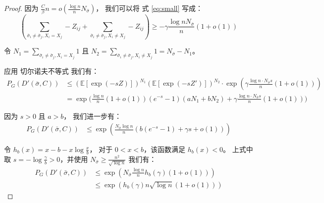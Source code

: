 \begin{proof}
	因为 $\frac{C}{\beta} n = o\left(\frac{\log n}{n} N_{\bar{\sigma}} \right)$，
  我们可以将 式 \eqref{eq:small} 写成：
\begin{equation}
	\left( \sum_{\bar{\sigma}_i  \neq \bar{\sigma}_j, X_i = X_j} -Z_{ij}
	+ \sum_{\bar{\sigma}_i  \neq \bar{\sigma}_j, X_i \neq X_j} -Z_{ij} \right)\geq 
  -\gamma\frac{\log n N_{\bar{\sigma}}}{n}(1+o(1))
\end{equation}
	
	令 $N_1 = \sum_{\bar{\sigma}_i  \neq \bar{\sigma}_j, X_i = X_j} 1$
	且 $N_2 = \sum_{\bar{\sigma}_i  \neq \bar{\sigma}_j, X_i \neq X_j} 1 = N_{\bar{\sigma}} - N_1$。
	
	应用 切尔诺夫不等式 我们有：
	\begin{align*}
	P_G(D'(\bar{\sigma}, C))&
	\leq (\mathbb{E}[\exp(-s Z )])^{N_1} (\mathbb{E}[\exp(-s Z' )])^{N_2} \cdot 
  \exp \left(\gamma \frac{\log n \cdot N_{\bar{\sigma}} s}{n}(1+o(1)) \right) \\
	&= \exp \Big( \frac{\log n}{n}(1+o(1))(e^{-s}-1)(aN_1 + bN_2) 
	+\gamma \frac{\log n \cdot N_{\bar{\sigma}} s}{n}(1+o(1))\Big)
	\end{align*}
	
	因为 $s > 0$ 且 $a>b$，
  我们进一步有：
	\begin{align*}
	P_G(D'(\bar{\sigma}, C))
	& \leq \exp \left( \frac{N_{\bar{\sigma}}\log n }{n}(b(e^{-s}-1)+ \gamma s + o(1)) \right) 
	\end{align*}
	
	令 $h_b(x) = x - b -x\log \frac{x}{b}$，
  对于 $0<x<b$，该函数满足  $h_b(x) < 0$。
	上式中取 $s=-\log\frac{\gamma}{b} > 0$，并使用
	$N_{\bar{\sigma}} \geq \frac{n^2}{\sqrt{\log n}}$ 我们有：
	\begin{align*}
	P_G(D'(\bar{\sigma}, C))&\leq \exp( N_{\bar{\sigma}} \frac{\log n}{n} h_b(\gamma)(1+o(1))) \\
	& \leq \exp (h_b(\gamma) n \sqrt{\log n} (1+o(1)))
	\end{align*}
\end{proof}

